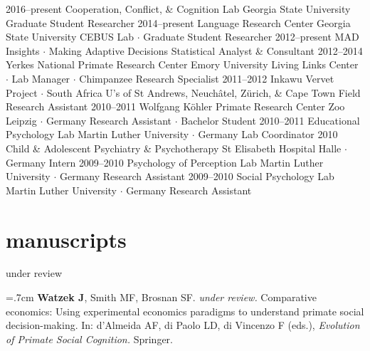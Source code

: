 \documentclass[]{friggeri-cv}
\begin{document}
\begin{entrylist}
  \entry
    {2016--present}
    {Cooperation, Conflict, \& Cognition Lab}
    {Georgia State University}
    {Graduate Student Researcher}
  \entry
    {2014--present}
    {Language Research Center}
    {Georgia State University}
    {CEBUS Lab $\cdot$ Graduate Student Researcher}
  \entry
    {2012--present}
    {MAD Insights $\cdot$ Making Adaptive Decisions}
    {}
    {Statistical Analyst \& Consultant}
  \entry
    {2012--2014}
    {Yerkes National Primate Research Center}
    {Emory University}
    {Living Links Center $\cdot$ Lab Manager $\cdot$ Chimpanzee Research Specialist}
  \entry
    {2011--2012}
    {Inkawu Vervet Project $\cdot$ South Africa}
    {U's of St Andrews, Neuch\^{a}tel, Z\"urich, \& Cape Town}
    {Field Research Assistant}
  \entry
    {2010--2011}
    {Wolfgang K\"{o}hler Primate Research Center}
    {Zoo Leipzig $\cdot$ Germany}
    {Research Assistant $\cdot$ Bachelor Student}
  \entry
    {2010--2011}
    {Educational Psychology Lab}
    {Martin Luther University $\cdot$ Germany}
    {Lab Coordinator}
  \entry
    {2010}
    {Child \& Adolescent Psychiatry \& Psychotherapy}
    {St Elisabeth Hospital Halle $\cdot$ Germany}
    {Intern}
  \entry
    {2009--2010}
    {Psychology of Perception Lab}
    {Martin Luther University $\cdot$ Germany}
    {Research Assistant}
  \entry
    {2009--2010}
    {Social Psychology Lab}
    {Martin Luther University $\cdot$ Germany}
    {Research Assistant}
\end{entrylist}


\newpage
\thispagestyle{fancy}

\section{manuscripts}

{\large{} under review}

\hangindent=.7cm \textbf{Watzek J}, Smith MF, Brosnan SF. \emph{under review.} Comparative economics: Using experimental economics paradigms to understand primate social decision-making. In: d'Almeida AF, di Paolo LD, di Vincenzo F (eds.), \emph{Evolution of Primate Social Cognition.} Springer.
\end{document}
